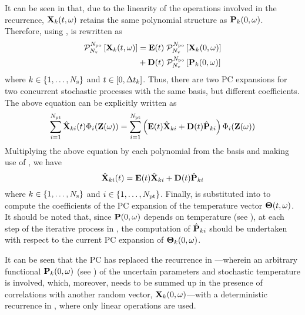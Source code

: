 It can be seen in  that, due to the linearity of the operations involved in the recurrence, $\mathbf{X}_k(t, \omega)$ retains the same polynomial structure as $\mathbf{P}_k(0, \omega)$. Therefore, using ,  is rewritten as
\begin{align*}
  \oPC{\vars}{\pcorder}{\vX_k(\t, \o)} & = \mE(\t) \; \oPC{\vars}{\pcorder}{\vX_k(0, \o)} \\
  & {} + \mD(\t) \; \oPC{\vars}{\pcorder}{\vP_k(0, \o)}
\end{align*}
where $k \in \{ 1, \dotsc, N_\text{s} \}$ and $t \in [0, \Delta t_k]$. Thus, there are two PC expansions for two concurrent stochastic processes with the same basis, but different coefficients. The above equation can be explicitly written as
\[
  \sum_{i = 1}^{\pcterms} \pcc{\vX}_{ki}(\t) \pcb_i(\vZ(\o)) = \sum_{i = 1}^{\pcterms} \left( \mE(\t) \pcc{\vX}_{ki} + \mD(\t) \pcc{\vP}_{ki} \right) \pcb_i(\vZ(\o))
\]
Multiplying the above equation by each polynomial from the basis and making use of , we have
\begin{equation} \elabel{pc-recurrence}
  \pcc{\vX}_{ki}(\t) = \mE(\t) \pcc{\vX}_{ki} + \mD(\t) \pcc{\vP}_{ki}
\end{equation}
where $k \in \{ 1, \dots, N_\text{s} \}$ and $i \in \{ 1, \dotsc, {N_\text{pt}} \}$. Finally,  is substituted into  to compute the coefficients of the PC expansion of the temperature vector ${\boldsymbol\Theta}(t, \omega)$. It should be noted that, since $\mathbf{P}(0, \omega)$ depends on temperature (see ), at each step of the iterative process in , the computation of $\hat{\mathbf{P}}_{ki}$ should be undertaken with respect to the current PC expansion of ${\boldsymbol\Theta}_k(0, \omega)$.

It can be seen that the PC has replaced the recurrence in ---wherein an arbitrary functional $\mathbf{P}_k(0, \omega)$ (see ) of the uncertain parameters and stochastic temperature is involved, which, moreover, needs to be summed up in the presence of correlations with another random vector, $\mathbf{X}_k(0, \omega)$---with a deterministic recurrence in , where only linear operations are used.
